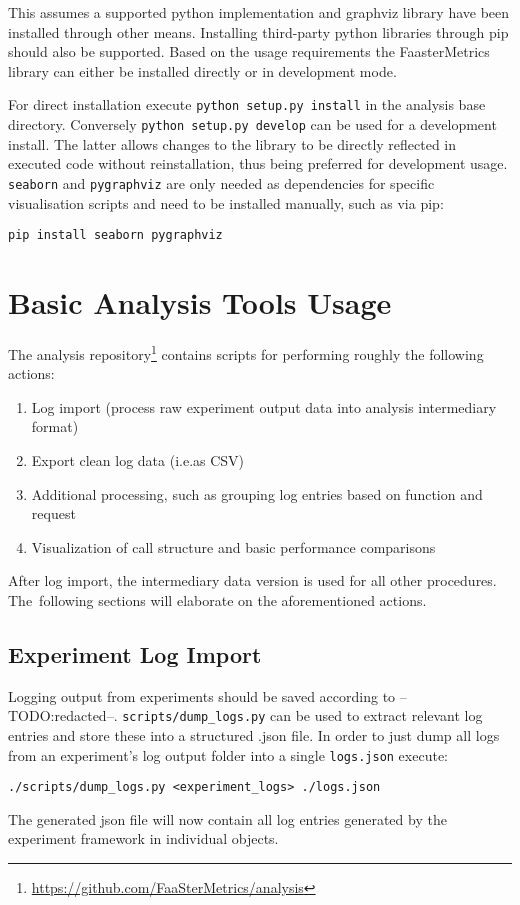 \documentclass[../main.tex]{subfiles}
\begin{document}
This assumes a supported python implementation and graphviz library have been installed through other means. 
Installing third-party python libraries through pip should also be supported. 
Based on the usage requirements the FaasterMetrics library can either be installed directly or in development mode. 

For direct installation execute \texttt{python setup.py install} in the analysis base directory. 
Conversely \texttt{python setup.py develop} can be used for a development install. 
The latter allows changes to the library to be directly reflected in executed code without reinstallation,
thus being preferred for development usage.
\texttt{seaborn} and \texttt{pygraphviz} are only needed as dependencies for specific visualisation scripts 
and need to be installed manually, such as via pip:
\begin{tcolorbox}
  \texttt{pip install seaborn pygraphviz}
\end{tcolorbox}

\section{Basic Analysis Tools Usage}\label{sec:analysisBasicUsage}

The analysis repository\footnote{\url{https://github.com/FaaSterMetrics/analysis}}
contains scripts for performing roughly the following actions:
\begin{enumerate}
  \item Log import (process raw experiment output data into analysis intermediary format)
  \item Export clean log data (i.e.\@ as CSV)
  \item Additional processing, such as grouping log entries based on function and request
  \item Visualization of call structure and basic performance comparisons
\end{enumerate}
After log import, the intermediary data version is used for all other procedures. 
The~following sections will elaborate on the aforementioned actions.

\subsection{Experiment Log Import}%
\label{sub:analysisUsageLogImport}

Logging output from experiments should be saved according to --TODO:\@ redacted--.
\texttt{scripts/dump\_logs.py} can be used to extract relevant log entries and store these into a structured .json file.
In order to just dump all logs from an experiment's log output folder into a single \texttt{logs.json} execute:
\begin{tcolorbox}
  \texttt{./scripts/dump_logs.py <experiment_logs> ./logs.json}
\end{tcolorbox}\noindent
The generated json file will now contain all log entries generated by the experiment framework in individual objects.
\end{document}
